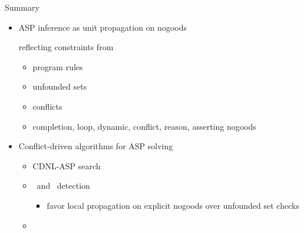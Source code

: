\begin{frame}{Summary}
  \bigskip
  \begin{itemize}
  \item ASP inference as unit propagation on nogoods

    reflecting constraints from
    \begin{itemize}\normalsize
    \item program rules
    \item unfounded sets
    \item conflicts
      \medskip
    \item<only@2-> [\qquad\itarrow]
      completion,
      loop,
      dynamic,
      conflict,
      reason,
      asserting
      nogoods
    \end{itemize}
    \medskip
  \item Conflict-driven algorithms for ASP solving
    \begin{itemize}\normalsize
    \item {CDNL-ASP} search
      \smallskip
    \item \Propagation\ and \UnFoundedSet\ detection
      \begin{itemize}
      \item<only@3-> [\itarrow] favor local propagation on explicit nogoods
        over unfounded set checks
      \end{itemize}
    \item \ConflictAnalysis
    \end{itemize}
  \end{itemize}
\end{frame}
%
